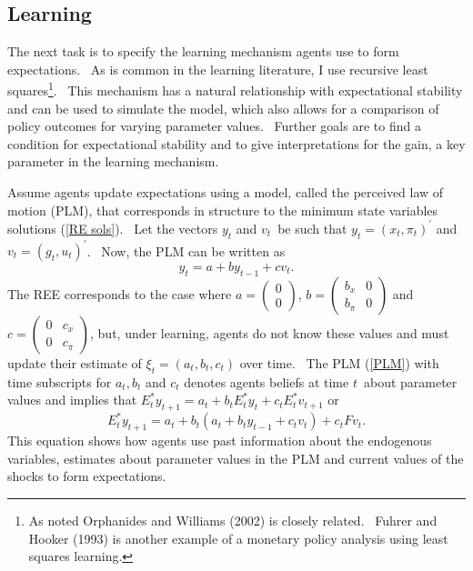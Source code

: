 \documentclass{article}
\begin{document}
\begin{doublespace}
\section{Learning}

The next task is to specify the learning mechanism agents use to form
expectations. \ As is common in the learning literature, I use recursive
least squares\footnote{%
As noted Orphanides and Williams (2002) is closely related. \ Fuhrer and
Hooker (1993) is another example of a monetary policy analysis using least
squares learning.}. \ This mechanism has a natural relationship with
expectational stability and can be used to simulate the model, which also
allows for a comparison of policy outcomes for varying parameter values. \
Further goals are to find a condition for expectational stability and to
give interpretations for the gain, a key parameter in the learning mechanism.

Assume agents update expectations using a model, called the perceived law of
motion (PLM), that corresponds in structure to the minimum state variables
solutions (\ref{RE sols}). \ Let the vectors $y_{t}$ and $v_{t}$\ be such
that $y_{t}=\left( x_{t},\pi _{t}\right) ^{\prime }$ and $v_{t}=\left(
g_{t},u_{t}\right) ^{\prime }$. \ Now, the PLM can be written as%
\begin{equation}
y_{t}=a+by_{t-1}+cv_{t}\text{.}  \label{PLM}
\end{equation}%
The REE corresponds to the case where $a=\left( 
\begin{array}{c}
0 \\ 
0%
\end{array}%
\right) $, $b=\left( 
\begin{array}{cc}
b_{x} & 0 \\ 
b_{\pi } & 0%
\end{array}%
\right) $ and $c=\left( 
\begin{array}{cc}
0 & c_{x} \\ 
0 & c_{\pi }%
\end{array}%
\right) $, but, under learning, agents do not know these values and must
update their estimate of $\xi _{t}=\left( a_{t},b_{t},c_{t}\right) $ over
time. \ The PLM (\ref{PLM}) with time subscripts for $a_{t},b_{t}$ and $%
c_{t} $ denotes agents beliefs at time $t$\ about parameter values and
implies that $E_{t}^{\ast }y_{t+1}=a_{t}+b_{t}E_{t}^{\ast
}y_{t}+c_{t}E_{t}^{\ast }v_{t+1}$ or%
\begin{equation}
E_{t}^{\ast }y_{t+1}=a_{t}+b_{t}\left( a_{t}+b_{t}y_{t-1}+c_{t}v_{t}\right)
+c_{t}Fv_{t}.  \label{exp}
\end{equation}%
This equation shows how agents use past information about the endogenous
variables, estimates about parameter values in the PLM and current values of
the shocks to form expectations.


\end{doublespace}
\end{document}
